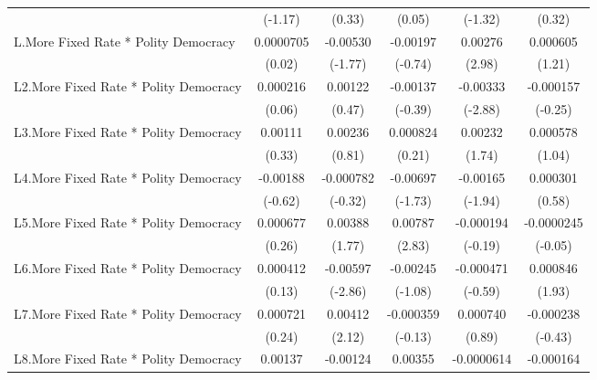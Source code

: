 {\begin{longtable}{l*{5}{c}}
                &  (-1.17)         &   (0.33)         &   (0.05)         &  (-1.32)         &   (0.32)         \\
[1em]
L.More Fixed Rate * Polity Democracy&0.0000705         & -0.00530         & -0.00197         &  0.00276\sym{**} & 0.000605         \\
                &   (0.02)         &  (-1.77)         &  (-0.74)         &   (2.98)         &   (1.21)         \\
[1em]
L2.More Fixed Rate * Polity Democracy& 0.000216         &  0.00122         & -0.00137         & -0.00333\sym{**} &-0.000157         \\
                &   (0.06)         &   (0.47)         &  (-0.39)         &  (-2.88)         &  (-0.25)         \\
[1em]
L3.More Fixed Rate * Polity Democracy&  0.00111         &  0.00236         & 0.000824         &  0.00232         & 0.000578         \\
                &   (0.33)         &   (0.81)         &   (0.21)         &   (1.74)         &   (1.04)         \\
[1em]
L4.More Fixed Rate * Polity Democracy& -0.00188         &-0.000782         & -0.00697         & -0.00165         & 0.000301         \\
                &  (-0.62)         &  (-0.32)         &  (-1.73)         &  (-1.94)         &   (0.58)         \\
[1em]
L5.More Fixed Rate * Polity Democracy& 0.000677         &  0.00388         &  0.00787\sym{**} &-0.000194         &-0.0000245         \\
                &   (0.26)         &   (1.77)         &   (2.83)         &  (-0.19)         &  (-0.05)         \\
[1em]
L6.More Fixed Rate * Polity Democracy& 0.000412         & -0.00597\sym{**} & -0.00245         &-0.000471         & 0.000846         \\
                &   (0.13)         &  (-2.86)         &  (-1.08)         &  (-0.59)         &   (1.93)         \\
[1em]
L7.More Fixed Rate * Polity Democracy& 0.000721         &  0.00412\sym{*}  &-0.000359         & 0.000740         &-0.000238         \\
                &   (0.24)         &   (2.12)         &  (-0.13)         &   (0.89)         &  (-0.43)         \\
[1em]
L8.More Fixed Rate * Polity Democracy&  0.00137         & -0.00124         &  0.00355         &-0.0000614         &-0.000164         \\

\end{longtable}}
